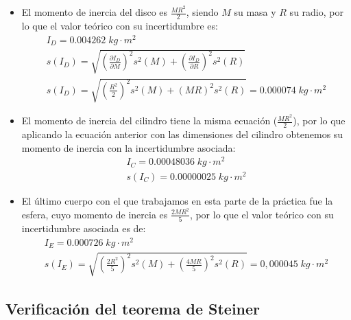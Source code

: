 \documentclass[a4paper,12pt,titlepage]{report}
\begin{document}
\begin{itemize}
    \item El momento de inercia del disco es $\frac{MR^2}{2}$, siendo $M$ su masa y $R$ su radio, por lo que el valor teórico con su incertidumbre es:
    \begin{equation}
        \begin{gathered}
            I_D = 0.004262 \; kg \cdot m^2\\
            s(I_D) = \sqrt{\left (\frac{\partial I_D}{\partial M}\right )^2s^2(M) + \left (\frac{\partial I_D}{\partial R}\right )^2s^2(R)} \\ s(I_D)= \sqrt{\left (\frac{R^2}{2}\right )^2s^2(M) + (MR)^2s^2(R)} = 0.000074 \;kg\cdot m^2
        \end{gathered}
    \end{equation}
    \item El momento de inercia del cilindro tiene la misma ecuación ($\frac{MR^2}{2}$), por lo que aplicando la ecuación anterior con las dimensiones del cilindro obtenemos su momento de inercia con la incertidumbre asociada:
    \begin{equation}
        \begin{gathered}
            I_C = 0.00048036 \; kg \cdot m^2\\
            s(I_C) = 0.00000025 \; kg \cdot m^2
        \end{gathered}
    \end{equation}
    \item El último cuerpo con el que trabajamos en esta parte de la práctica fue la esfera, cuyo momento de inercia es $\frac{2MR^2}{5}$, por lo que el valor teórico con su incertidumbre asociada es de:
    \begin{equation}
        \begin{gathered}
            I_E = 0.000726 \; kg \cdot m^2 \\
            s(I_E) = \sqrt{\left (\frac{2R^2}{5}\right )^2s^2(M) + \left (\frac{4MR}{5}\right )^2s^2(R)} = 0,000045 \; kg\cdot m^2
        \end{gathered}
    \end{equation}
\end{itemize}

\newpage

\subsection{Verificación del teorema de Steiner}
\end{document}
